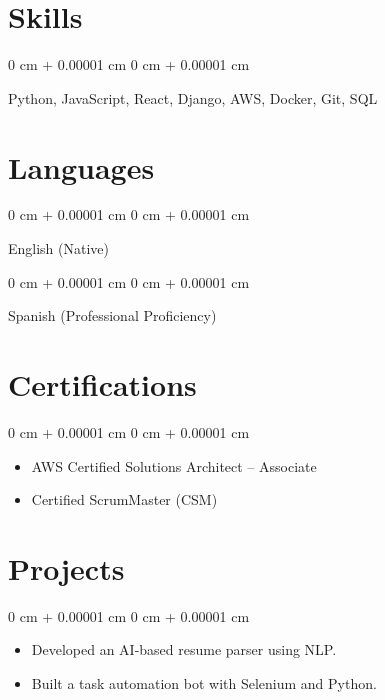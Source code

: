 \documentclass[10pt, letterpaper]{article}
\newenvironment{highlights}{
    \begin{itemize}[
        topsep=0.10 cm,
        parsep=0.10 cm,
        partopsep=0pt,
        itemsep=0pt,
        leftmargin=0 cm + 10pt
    ]
}{
    \end{itemize}
} %
\newenvironment{onecolentry}{
    \begin{adjustwidth}{
        0 cm + 0.00001 cm
    }{
        0 cm + 0.00001 cm
    }
}{
    \end{adjustwidth}
} %
\begin{document}
\vspace{-0.2 cm}
\section{Skills}     
    \begin{onecolentry}
    Python, JavaScript, React, Django, AWS, Docker, Git, SQL
    \end{onecolentry}
\section{Languages}      
 
    \begin{onecolentry}
        English (Native)
    \end{onecolentry}
 
    \begin{onecolentry}
        Spanish (Professional Proficiency)
    \end{onecolentry}

 
\section{ Certifications }      
    \begin{onecolentry}
        
        \vspace{0.2 cm}
        \begin{highlights}
             
                \item AWS Certified Solutions Architect – Associate
             
                \item Certified ScrumMaster (CSM)
            
        \end{highlights}
    \end{onecolentry}      
 
\section{ Projects }      
    \begin{onecolentry}
        
        \vspace{0.2 cm}
        \begin{highlights}
             
                \item Developed an AI-based resume parser using NLP.
             
                \item Built a task automation bot with Selenium and Python.
            
        \end{highlights}
    \end{onecolentry}      
\end{document}
